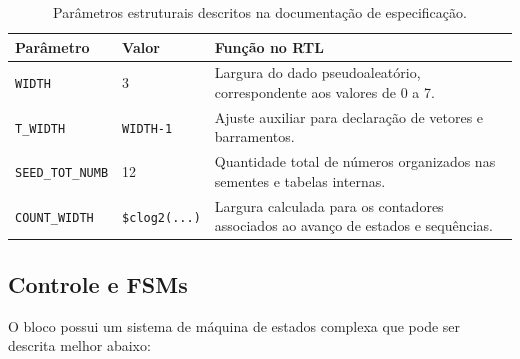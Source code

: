 \documentclass[12pt,a4paper]{article}
\begin{document}
	\begin{table}[H]
		\centering
		\small
		\begin{tabularx}{\textwidth}{|M{2.6cm}|M{2.5cm}|Y|}
			\hline
			\textbf{Parâmetro} & \textbf{Valor} & \textbf{Função no RTL} \\
			\hline
			\texttt{WIDTH} & 3 & Largura do dado pseudoaleatório, correspondente aos valores de 0 a 7. \\
			\hline
			\texttt{T\_WIDTH} & \texttt{WIDTH-1} & Ajuste auxiliar para declaração de vetores e barramentos. \\
			\hline
			\texttt{SEED\_TOT\_NUMB} & 12 & Quantidade total de números organizados nas sementes e tabelas internas. \\
			\hline
			\texttt{COUNT\_WIDTH} & \texttt{\$clog2(...)} & Largura calculada para os contadores associados ao avanço de estados e sequências. \\
			\hline
		\end{tabularx}
		\caption{Parâmetros estruturais descritos na documentação de especificação.}
	\end{table}
	
	\subsection*{Controle e FSMs}
	
	O bloco possui um sistema de máquina de estados complexa que pode ser descrita melhor abaixo:
	
	\vspace{0.5cm}
	
\end{document}
